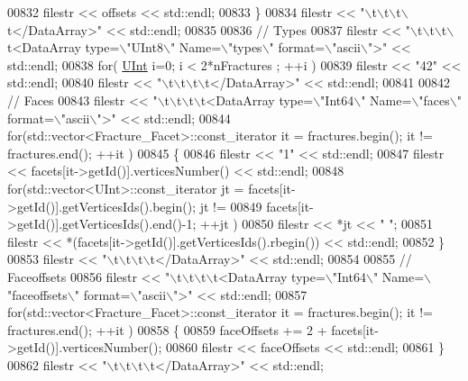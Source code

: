 \begin{DoxyCode}
00832         filestr << offsets << std::endl;
00833     \}
00834     filestr << \textcolor{stringliteral}{"\(\backslash\)t\(\backslash\)t\(\backslash\)t\(\backslash\)t</DataArray>"} << std::endl;
00835 
00836     \textcolor{comment}{//  Types}
00837     filestr << \textcolor{stringliteral}{"\(\backslash\)t\(\backslash\)t\(\backslash\)t\(\backslash\)t<DataArray type=\(\backslash\)"UInt8\(\backslash\)" Name=\(\backslash\)"types\(\backslash\)" format=\(\backslash\)"ascii\(\backslash\)">"} << std::endl;
00838     \textcolor{keywordflow}{for}( \hyperlink{namespaceFVCode3D_a4bf7e328c75d0fd504050d040ebe9eda}{UInt} i=0; i < 2*nFractures ; ++i )
00839         filestr << \textcolor{stringliteral}{"42"} << std::endl;
00840     filestr << \textcolor{stringliteral}{"\(\backslash\)t\(\backslash\)t\(\backslash\)t\(\backslash\)t</DataArray>"} << std::endl;
00841 
00842     \textcolor{comment}{//  Faces}
00843     filestr << \textcolor{stringliteral}{"\(\backslash\)t\(\backslash\)t\(\backslash\)t\(\backslash\)t<DataArray type=\(\backslash\)"Int64\(\backslash\)" Name=\(\backslash\)"faces\(\backslash\)" format=\(\backslash\)"ascii\(\backslash\)">"} << std::endl;
00844     \textcolor{keywordflow}{for}(std::vector<Fracture\_Facet>::const\_iterator it = fractures.begin(); it != fractures.end(); ++it )
00845     \{
00846         filestr << \textcolor{stringliteral}{"1"} << std::endl;
00847         filestr << facets[it->getId()].verticesNumber() << std::endl;
00848         \textcolor{keywordflow}{for}(std::vector<UInt>::const\_iterator jt = facets[it->getId()].getVerticesIds().begin(); jt !=
00849             facets[it->getId()].getVerticesIds().end()-1; ++jt )
00850             filestr << *jt << \textcolor{stringliteral}{" "};
00851         filestr << *(facets[it->getId()].getVerticesIds().rbegin()) << std::endl;
00852     \}
00853     filestr << \textcolor{stringliteral}{"\(\backslash\)t\(\backslash\)t\(\backslash\)t\(\backslash\)t</DataArray>"} << std::endl;
00854 
00855     \textcolor{comment}{//  Faceoffsets}
00856     filestr << \textcolor{stringliteral}{"\(\backslash\)t\(\backslash\)t\(\backslash\)t\(\backslash\)t<DataArray type=\(\backslash\)"Int64\(\backslash\)" Name=\(\backslash\)"faceoffsets\(\backslash\)" format=\(\backslash\)"ascii\(\backslash\)">"} << std::endl;
00857     \textcolor{keywordflow}{for}(std::vector<Fracture\_Facet>::const\_iterator it = fractures.begin(); it != fractures.end(); ++it )
00858     \{
00859         faceOffsets += 2 + facets[it->getId()].verticesNumber();
00860         filestr << faceOffsets << std::endl;
00861     \}
00862     filestr << \textcolor{stringliteral}{"\(\backslash\)t\(\backslash\)t\(\backslash\)t\(\backslash\)t</DataArray>"} << std::endl;

\end{DoxyCode}
